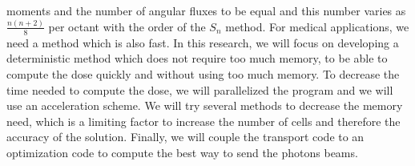 moments and the number of angular fluxes to be equal and this number varies as
$\frac{n(n+2)}{8}$ per octant with the order of the $S_n$ method. For medical
applications, we need a method which is also fast. In this research, we will
focus on developing a deterministic method which does not require too much
memory, to be able to compute the dose quickly and without using too much
memory. To decrease the time needed to compute the dose, we will parallelized
the program and we will use an acceleration scheme. We will try several
methods to decrease the memory need, which is a limiting factor to increase
the number of cells and therefore the accuracy of the solution. Finally, we
will couple the transport code to an optimization code to compute the best way
to send the photons beams. 
